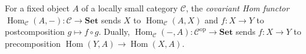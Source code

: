 
For a fixed object $A$ of a locally small category $\mathcal C$, the \emph{covariant Hom functor} $\operatorname{Hom}_{\mathcal C}(A,-):\mathcal C\to\mathbf{Set}$ sends $X$ to $\operatorname{Hom}_{\mathcal C}(A,X)$ and $f:X\to Y$ to postcomposition $g\mapsto f\circ g$. Dually, $\operatorname{Hom}_{\mathcal C}(-,A):\mathcal C^{\mathrm{op}}\to\mathbf{Set}$ sends $f:X\to Y$ to precomposition $\operatorname{Hom}(Y,A)\to\operatorname{Hom}(X,A)$.
